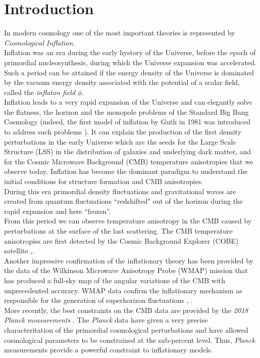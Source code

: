 \documentclass[11pt,a4paper,twoside]{book}
\begin{document}
\tableofcontents
	

\chapter{Introduction}

In modern cosmology one of the most important theories is represented by \textit{Cosmological Inflation}. \\
Inflation was an era during the early hystory of the Universe, before the epoch of primordial nucleosynthesis, during which the Universe expansion was accelerated. Such a period can be attained if the energy density of the Universe is dominated by the vacuum energy density associated with the potential of a scalar field, called the \textit{inflaton field} $ \phi $. \\
Inflation leads to a very rapid expansion of the Universe and can elegantly solve the flatness, the horizon and the monopole problems of the Standard Big Bang Cosmology (indeed, the first model of inflation by Guth in 1981 was introduced to address such problems \cite{Guth:Intro}). It can explain the production of the first density perturbations in the early Universe which are the seeds for the Large Scale Structure (LSS) in the distribution of galaxies and underlying dark matter, and for the Cosmic Microwave Background (CMB) temperature anisotropies that we observe today. Inflation has become the dominant paradigm to understand the initial conditions for structure formation and CMB anisotropies.\\
During this era primordial density fluctuations and gravitational waves are created from quantum fluctuations \textquotedblleft redshifted" out of the horizon during the rapid expansion and here \textquotedblleft frozen\textquotedblright.\\
From this period we can observe temperature anisotropy in the CMB caused by perturbations at the surface of the last scattering. The CMB temperature anisotropies are first detected by the Cosmic Background Explorer (COBE) satellite \cite{COBE1:intro},\cite{COBE2:intro}. \\
Another impressive confirmation of the inflationary theory has been provided by the data of the Wilkinson Microwave Anisotropy Probe (WMAP) mission that has produced a full-sky map of the angular variations of the CMB with unprecedented accuracy. WMAP data confirm the inflationary mechanism as responsible for the generation of superhorizon fluctuations \cite{WMAP:intro}, \cite{NonGauss:Intro}.\\
More recently, the best constraints on the CMB data are provided by the \textit{2018 Planck measurements} \cite{Planck2018:intro}. The \textit{Planck} data have given a very precise characteritation of the primordial cosmological perturbations and have allowed cosmological parameters to be constrained at the sub-percent level. Thus, \textit{Planck} measurements provide  a powerful constraint to inflationary models.\\
\end{document}
